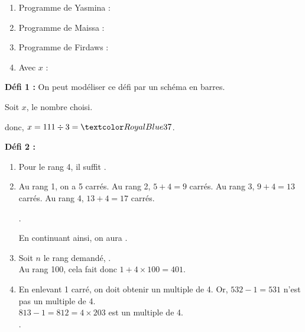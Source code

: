 \vfill



    \begin{enumerate}
        \item Programme de Yasmina :  \smallskip    
        \item Programme de Maissa :  \smallskip        
        \item Programme de Firdaws :  \smallskip
        \item Avec $x$ : 
    \end{enumerate}

\vfill



    {\bf Défi 1 :} On peut modéliser ce défi par un schéma en barres. \par
        Soit $x$, le nombre choisi. \par \medskip
         \par \medskip
         \par \medskip
         \par \medskip
        donc, $x =111\div3 =\cor{37}$.

    \bigskip

    {\bf Défi 2 :} 
        \begin{enumerate}
            \item Pour le rang 4, il suffit .
            \item Au rang 1, on a 5 carrés. Au rang 2, $5+4 =9$ carrés. Au rang 3, $9+4 =13$ carrés. Au rang 4, $13+4 =17$ carrés. \par
                . \par
                En continuant ainsi, on aura .
            \item Soit $n$ le rang demandé, . \\
                Au rang 100, cela fait donc $1+4\times100 =401$.
            \item En enlevant 1 carré, on doit obtenir un multiple de 4. Or, $532-1 =531$ n'est pas un multiple de 4. \\
                $813-1 =812 =4\times203$ est un multiple de 4. \\
                .     
        \end{enumerate}

